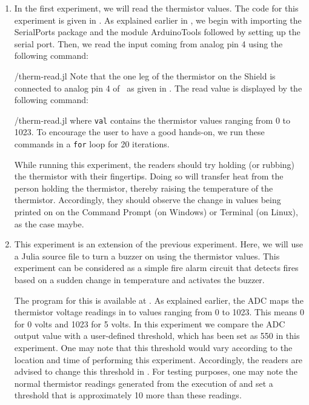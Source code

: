 \begin{enumerate}
  \item In the first experiment, we will read the thermistor values.
        The code for this experiment is given in
        . As explained earlier in , we begin with importing the SerialPorts
        \cite{julia-serial-ports} package and the module ArduinoTools followed by setting up the serial port.
        Then, we read the input coming from analog pin 4 using the
        following command:
        
        {\LocTHERMjuliacode/therm-read.jl} Note that the one leg of the thermistor on
        the Shield is connected to analog pin 4 of \arduino\,
        as given in . The read value is displayed
        by the following command:
        
        {\LocTHERMjuliacode/therm-read.jl} where {\tt val} contains
        the thermistor values ranging from 0 to 1023. To
        encourage the user to have a good hands-on, we run these commands in
        a {\tt for} loop for 20 iterations.

        While running this experiment,
        the readers should try holding (or rubbing) the thermistor with their fingertips.
        Doing so will transfer heat from the person holding the
        thermistor, thereby raising the temperature of the thermistor.
        Accordingly, they should observe the change in values being printed on on the
        Command Prompt (on Windows) or Terminal (on Linux), as the case maybe.

  \item This experiment is an extension of the previous
        experiment. Here, we will use a Julia source file to
        turn a buzzer on using the thermistor values. This experiment
        can be considered as a simple fire alarm circuit that
        detects fires based on a sudden change in temperature and
        activates the buzzer.

        The program for this is available at
        .  As explained earlier,
        the ADC maps the thermistor voltage readings in to values
        ranging from 0 to 1023. This means 0 for 0 volts and 1023 for 5
        volts. In this experiment we compare the ADC output value with a user-defined
        threshold, which has been set as 550 in this experiment. One may note that
        this threshold would vary according to the location and time of performing
        this experiment. Accordingly, the readers are advised to change this threshold
        in . For testing purposes, one may note the
        normal thermistor readings generated from the execution of 
        and set a threshold that is approximately 10 more than these readings.



\end{enumerate}
